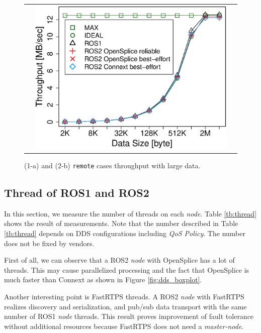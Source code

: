 \documentclass{sig-alternate-05-2015}
\begin{document}
\begin{figure}[t]
\begin{tabular}{ccc}
\begin{minipage}[t]{0.32\textwidth}
      \label{fig:throughput_small}
    \end{minipage}
    &
    \begin{minipage}[t]{0.32\textwidth}
      \includegraphics[width=1.0\linewidth]{../figure/throughput_remote_large-data.eps}
      \vspace{-7mm}
      \caption{(1-a) and (2-b) \texttt{remote} cases throughput with large data.}
      \label{fig:throughput_large}
    \end{minipage}
  \end{tabular}
  \vspace{-8mm}
\end{figure}


\vspace{-1mm}
\subsection{Thread of ROS1 and ROS2}
\label{sec:throughput}
In this section, we measure the number of threads on each \emph{node}.
Table \ref{tb:thread} shows the result of measurements.
Note that the number described in Table \ref{tb:thread} depends on DDS configurations including \emph{QoS Policy}.
The number does not be fixed by vendors.

First of all, we can observe that a ROS2 \emph{node} with OpenSplice has a lot of threads.
This may cause parallelized processing and the fact that OpenSplice is much faster than Connext as shown in Figure \ref{fig:dds_boxplot}.

Another interesting point is FastRTPS threads.
A ROS2 \emph{node} with FastRTPS realizes discovery and serialization, and pub/sub data transport with the same number of ROS1 \emph{node} threads.
This result proves improvement of fault tolerance without additional resources because FastRTPS does not need a \emph{master-node}.
\end{document}
